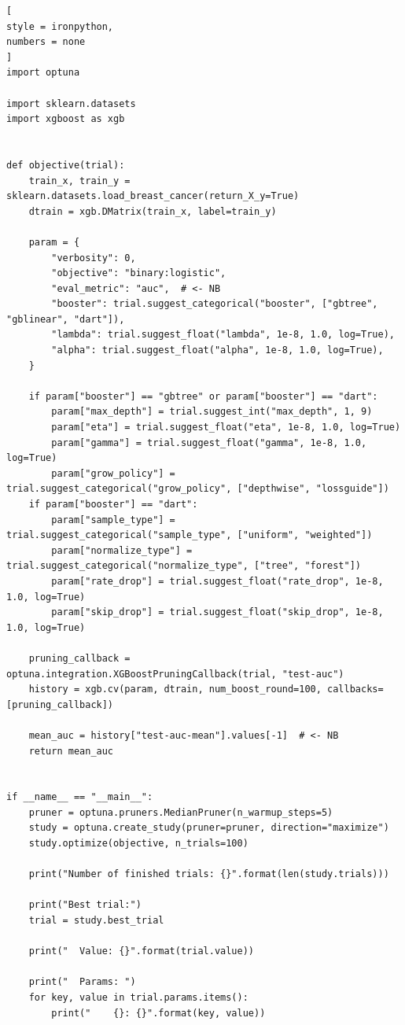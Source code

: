 \documentclass[%
	11pt,
	a4paper,
	utf8,
		]{article}
\begin{document}
\begin{lstlisting}[
style = ironpython,
numbers = none
]
import optuna

import sklearn.datasets
import xgboost as xgb


def objective(trial):
	train_x, train_y = sklearn.datasets.load_breast_cancer(return_X_y=True)
	dtrain = xgb.DMatrix(train_x, label=train_y)

	param = {
		"verbosity": 0,
		"objective": "binary:logistic",
		"eval_metric": "auc",  # <- NB
		"booster": trial.suggest_categorical("booster", ["gbtree", "gblinear", "dart"]),
		"lambda": trial.suggest_float("lambda", 1e-8, 1.0, log=True),
		"alpha": trial.suggest_float("alpha", 1e-8, 1.0, log=True),
	}

	if param["booster"] == "gbtree" or param["booster"] == "dart":
		param["max_depth"] = trial.suggest_int("max_depth", 1, 9)
		param["eta"] = trial.suggest_float("eta", 1e-8, 1.0, log=True)
		param["gamma"] = trial.suggest_float("gamma", 1e-8, 1.0, log=True)
		param["grow_policy"] = trial.suggest_categorical("grow_policy", ["depthwise", "lossguide"])
	if param["booster"] == "dart":
		param["sample_type"] = trial.suggest_categorical("sample_type", ["uniform", "weighted"])
		param["normalize_type"] = trial.suggest_categorical("normalize_type", ["tree", "forest"])
		param["rate_drop"] = trial.suggest_float("rate_drop", 1e-8, 1.0, log=True)
		param["skip_drop"] = trial.suggest_float("skip_drop", 1e-8, 1.0, log=True)

	pruning_callback = optuna.integration.XGBoostPruningCallback(trial, "test-auc")
	history = xgb.cv(param, dtrain, num_boost_round=100, callbacks=[pruning_callback])
	
	mean_auc = history["test-auc-mean"].values[-1]  # <- NB
	return mean_auc


if __name__ == "__main__":
	pruner = optuna.pruners.MedianPruner(n_warmup_steps=5)
	study = optuna.create_study(pruner=pruner, direction="maximize")
	study.optimize(objective, n_trials=100)
	
	print("Number of finished trials: {}".format(len(study.trials)))
	
	print("Best trial:")
	trial = study.best_trial
	
	print("  Value: {}".format(trial.value))
	
	print("  Params: ")
	for key, value in trial.params.items():
		print("    {}: {}".format(key, value))	
\end{lstlisting}
\end{document}
